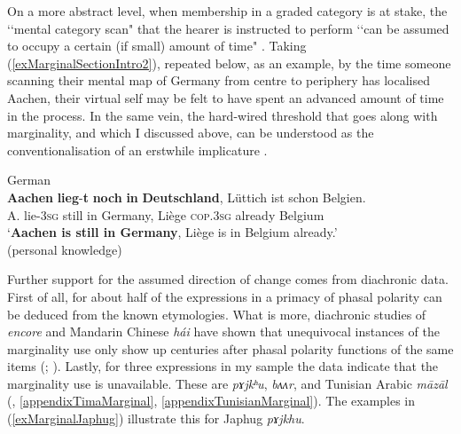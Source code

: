On a more abstract level, when membership in a graded category is at stake, the \lq\lq mental category scan" that the hearer is instructed to perform \lq\lq can be assumed to occupy a certain (if small) amount of time" \parencite[181]{MosegaardHansen2008}. Taking (\ref{exMarginalSectionIntro2}), repeated below, as an example, by the time someone scanning their mental map of Germany from centre to periphery has localised Aachen, their virtual self may be felt to have spent an advanced amount of time in the process. In the same vein, the hard-wired threshold that goes along with marginality, and which I discussed above, can be understood as the conventionalisation of an erstwhile implicature \parencite{Michaelis1993}.

\begin{exe}
	German\\
	\gll \textbf{Aachen} \textbf{lieg}-\textbf{t} \textbf{noch} \textbf{in} \textbf{Deutschland}, Lüttich ist schon Belgien.\\
	A. lie-3\textsc{sg} still in Germany, Liège \textsc{cop}.3\textsc{sg} already Belgium\\
	\glt \lq \textbf{Aachen is still in Germany}, Liège is in Belgium already.'
	\\(personal knowledge)
\end{exe}

Further support for the assumed direction of change comes from diachronic data. First of all, for about half of the expressions in  a primacy of phasal polarity can be deduced from the known etymologies. What is more, diachronic studies of  \textit{encore} and Mandarin Chinese \textit{hái} have shown that unequivocal instances of the marginality use only show up centuries after phasal polarity functions of the same items (\cite[177, 181]{MosegaardHansen2008}; \cite{Yeh1998}). Lastly, for three expressions in my sample the data indicate that the marginality use is unavailable. These are  \textit{pɤjkʰu},  \textit{bʌʌr}, and Tunisian Arabic \textit{māzāl} (, \ref{appendixTimaMarginal}, \ref{appendixTunisianMarginal}). The examples in (\ref{exMarginalJaphug}) illustrate this for Japhug \textit{pɤjkhu}.

